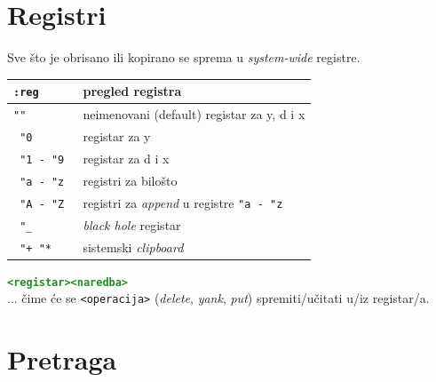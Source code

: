 \documentclass[10pt]{article}
\begin{document}
    \section*{\color{ForestGreen} Registri}
    Sve što je obrisano ili kopirano se sprema u \textit{system-wide} registre.
    \\
    \begin{tabular}{|>{\tt}p{9.00cm}|>{}p{15.50cm}|}
        \hline
        :reg            & pregled registra                                                  \\ \hline \hline
        ""              & neimenovani (default) registar za y, d i x                        \\ \hline
        "0              & registar za y                                                     \\ \hline
        "1 - "9         & registar za d i x                                                 \\ \hline \hline
        "a - "z         & registri za bilošto                                               \\ \hline
        "A - "Z         & registri za \textit{append} u registre \texttt{"a - "z}           \\ \hline
        "\_             & \textit{black hole} registar                                      \\ \hline
        "+ "*           & sistemski \textit{clipboard}                                      \\ \hline
    \end{tabular}
    \begin{center}
        \large
        \textcolor{ForestGreen}{\texttt{\textbf{<registar><naredba>}}}
        \\
        ... čime će se \texttt{<operacija>} (\textit{delete}, \textit{yank}, \textit{put}) spremiti/učitati u/iz registar/a. 
    \end{center}
    \newpage
    
    \section*{\color{ForestGreen} Pretraga}
\end{document}
